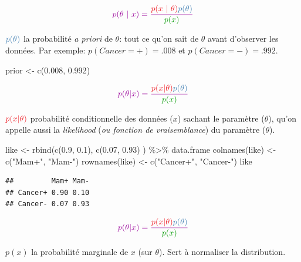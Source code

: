 \documentclass[
  a4paper,11pt,twoside,onecolumn,openright,final,oldfontcommands]{memoir}
\newenvironment{Shaded}{\begin{snugshade}}{\end{snugshade}}
\newcommand{\FloatTok}[1]{\textcolor[rgb]{0.00,0.00,0.81}{#1}}
\newcommand{\FunctionTok}[1]{\textcolor[rgb]{0.00,0.00,0.00}{#1}}
\newcommand{\NormalTok}[1]{#1}
\newcommand{\OtherTok}[1]{\textcolor[rgb]{0.56,0.35,0.01}{#1}}
\newcommand{\SpecialCharTok}[1]{\textcolor[rgb]{0.00,0.00,0.00}{#1}}
\newcommand{\StringTok}[1]{\textcolor[rgb]{0.31,0.60,0.02}{#1}}
\theoremstyle{definition}
\theoremstyle{definition}
\theoremstyle{definition}
\theoremstyle{remark}
\begin{document}
\[
\color{purple}{p(\theta \ | \ x)} = \dfrac{\color{orangered}{p(x \ | \ \theta)} \color{steelblue}{p(\theta)}}{\color{green}{p(x)}}
\]

\(\color{steelblue}{p(\theta)}\) { la probabilité \emph{a priori} de \(\theta\): tout ce qu'on sait de \(\theta\) avant d'observer les données. Par exemple: \(p(Cancer=+)=.008\) et \(p(Cancer=-)=.992\).}

\begin{Shaded}
\begin{Highlighting}[]
\NormalTok{prior }\OtherTok{\textless{}{-}} \FunctionTok{c}\NormalTok{(}\FloatTok{0.008}\NormalTok{, }\FloatTok{0.992}\NormalTok{)}
\end{Highlighting}
\end{Shaded}

\[
\color{purple}{p(\theta \vert x)} = \dfrac{\color{orangered}{p(x\vert \theta)} \color{steelblue}{p(\theta)}}{\color{green}{p(x)}}
\]

\(\color{orangered}{p(x\vert \theta)}\) { probabilité conditionnelle des données (\(x\)) sachant le paramètre (\(\theta\)), qu'on appelle aussi la \emph{likelihood} (\emph{ou fonction de vraisemblance}) du paramètre (\(\theta\)).}

\begin{Shaded}
\begin{Highlighting}[]
\NormalTok{like }\OtherTok{\textless{}{-}} \FunctionTok{rbind}\NormalTok{(}\FunctionTok{c}\NormalTok{(}\FloatTok{0.9}\NormalTok{, }\FloatTok{0.1}\NormalTok{), }\FunctionTok{c}\NormalTok{(}\FloatTok{0.07}\NormalTok{, }\FloatTok{0.93}\NormalTok{) ) }\SpecialCharTok{\%\textgreater{}\%}\NormalTok{ data.frame}
\FunctionTok{colnames}\NormalTok{(like) }\OtherTok{\textless{}{-}} \FunctionTok{c}\NormalTok{(}\StringTok{"Mam+"}\NormalTok{, }\StringTok{"Mam{-}"}\NormalTok{)}
\FunctionTok{rownames}\NormalTok{(like) }\OtherTok{\textless{}{-}} \FunctionTok{c}\NormalTok{(}\StringTok{"Cancer+"}\NormalTok{, }\StringTok{"Cancer{-}"}\NormalTok{)}
\NormalTok{like}
\end{Highlighting}
\end{Shaded}

\begin{verbatim}
##         Mam+ Mam-
## Cancer+ 0.90 0.10
## Cancer- 0.07 0.93
\end{verbatim}

\[
\color{purple}{p(\theta \vert x)} = \dfrac{\color{orangered}{p(x\vert \theta)} \color{steelblue}{p(\theta)}}{\color{green}{p(x)}}
\]

{ \(p(x)\) la probabilité marginale de \(x\) (sur \(\theta\)). Sert à normaliser la distribution.}
\end{document}
